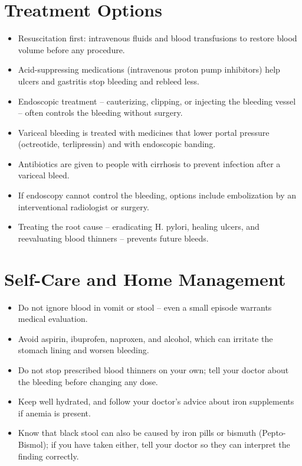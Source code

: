 \section*{Treatment Options}
\begin{itemize}
  \item Resuscitation first: intravenous fluids and blood transfusions to restore blood volume before any procedure.
  \item Acid-suppressing medications (intravenous proton pump inhibitors) help ulcers and gastritis stop bleeding and rebleed less.
  \item Endoscopic treatment -- cauterizing, clipping, or injecting the bleeding vessel -- often controls the bleeding without surgery.
  \item Variceal bleeding is treated with medicines that lower portal pressure (octreotide, terlipressin) and with endoscopic banding.
  \item Antibiotics are given to people with cirrhosis to prevent infection after a variceal bleed.
  \item If endoscopy cannot control the bleeding, options include embolization by an interventional radiologist or surgery.
  \item Treating the root cause -- eradicating H. pylori, healing ulcers, and reevaluating blood thinners -- prevents future bleeds.
\end{itemize}


\section*{Self-Care and Home Management}
\begin{itemize}
  \item Do not ignore blood in vomit or stool -- even a small episode warrants medical evaluation.
  \item Avoid aspirin, ibuprofen, naproxen, and alcohol, which can irritate the stomach lining and worsen bleeding.
  \item Do not stop prescribed blood thinners on your own; tell your doctor about the bleeding before changing any dose.
  \item Keep well hydrated, and follow your doctor's advice about iron supplements if anemia is present.
  \item Know that black stool can also be caused by iron pills or bismuth (Pepto-Bismol); if you have taken either, tell your doctor so they can interpret the finding correctly.
\end{itemize}

